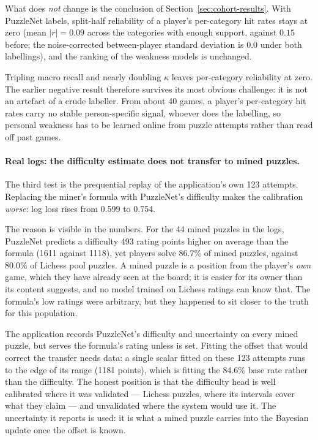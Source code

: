 What does \emph{not} change is the conclusion of Section~\ref{sec:cohort-results}. With PuzzleNet
labels, split-half reliability of a player's per-category hit rates stays at zero (mean $|r| = 0.09$
across the categories with enough support, against $0.15$ before; the noise-corrected between-player
standard deviation is 0.0 under both labellings), and the ranking of the weakness models is unchanged.

\begin{finding}
Tripling macro recall and nearly doubling $\kappa$ leaves per-category reliability at zero. The
earlier negative result therefore survives its most obvious challenge: it is not an artefact of a
crude labeller. From about 40 games, a player's per-category hit rates carry no stable
person-specific signal, whoever does the labelling, so personal weakness has to be learned online from
puzzle attempts rather than read off past games.
\end{finding}

\paragraph{Real logs: the difficulty estimate does not transfer to mined puzzles.} The third test is
the prequential replay of the application's own 123 attempts. Replacing the miner's formula with
PuzzleNet's difficulty makes the calibration \emph{worse}: log loss rises from 0.599 to 0.754.

The reason is visible in the numbers. For the 44 mined puzzles in the logs, PuzzleNet predicts a
difficulty 493 rating points higher on average than the formula (1611 against 1118), yet players solve
86.7\% of mined puzzles, against 80.0\% of Lichess pool puzzles. A mined puzzle is a position from the
player's \emph{own} game, which they have already seen at the board; it is easier for its owner than
its content suggests, and no model trained on Lichess ratings can know that. The formula's low ratings
were arbitrary, but they happened to sit closer to the truth for this population.

\begin{honest}
The application records PuzzleNet's difficulty and uncertainty on every mined puzzle, but serves the
formula's rating unless  is set. Fitting the offset that would correct
the transfer needs data: a single scalar fitted on these 123 attempts runs to the edge of its range
(1181 points), which is fitting the 84.6\% base rate rather than the difficulty. The honest position
is that the difficulty head is well calibrated where it was validated --- Lichess puzzles, where its
intervals cover what they claim --- and unvalidated where the system would use it. The uncertainty it
reports is used: it is what a mined puzzle carries into the Bayesian update once the offset is known.
\end{honest}
